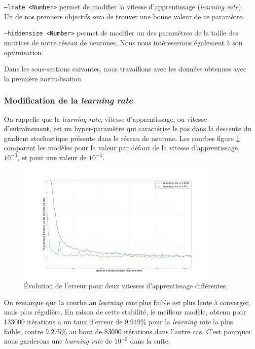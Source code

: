 \documentclass{report}
\begin{document}
\texttt{--lrate <Number>} permet de modifier la vitesse d'apprentissage (\textit{learning rate}).
Un de nos premiers objectifs sera de trouver une bonne valeur de ce paramètre.

\texttt{--hiddensize <Number>} permet de modifier un des paramètres de la taille des matrices de notre réseau de neurones.
Nous nous intéresserons également à son optimisation.

Dans les sous-sections suivantes, nous travaillons avec les données obtenues avec la première normalisation.

\subsubsection{Modification de la \textit{learning rate}}

On rappelle que la \textit{learning rate}, vitesse d'apprentissage, ou vitesse d'entraînement, est un hyper-paramètre qui caractérise le pas dans la descente du gradient stochastique présente dans le réseau de neurone.
Les courbes figure \ref{err_lrate} comparent les modèles pour la valeur par défaut de la vitesse d'apprentissage, $10^{-3}$, et pour une valeur de $10^{-4}$. 

\begin{figure}[!h] 
    \center
    \includegraphics[width=10cm]{error_plot_lrat.png}
    \caption{Évolution de l'erreur pour deux vitesses d'apprentissage différentes.}
    \label{err_lrate}
\end{figure}

On remarque que la courbe au \textit{learning rate} plus faible est plus lente à converger, mais plus régulière.
En raison de cette stabilité, le meilleur modèle, obtenu pour 133000 itérations a un taux d'erreur de 9.949\% pour la \textit{learning rate} la plus faible, contre 9.275\% au bout de 83000 itérations dans l'autre cas.
C'est pourquoi nous garderons une \textit{learning rate} de $10^{-3}$ dans la suite.
\end{document}
